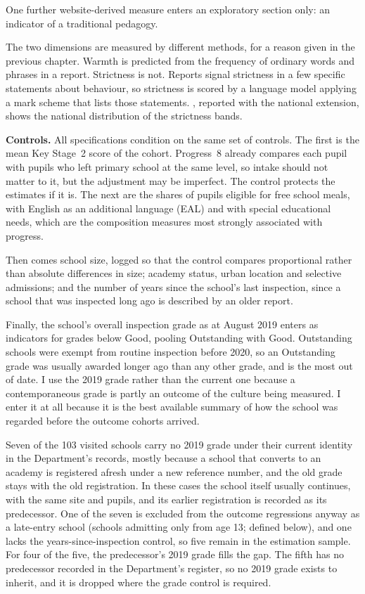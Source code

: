 One further website-derived measure enters an exploratory section only: an indicator of a traditional pedagogy.

The two dimensions are measured by different methods, for a reason given in the previous chapter. Warmth is predicted from the frequency of ordinary words and phrases in a report. Strictness is not. Reports signal strictness in a few specific statements about behaviour, so strictness is scored by a language model applying a mark scheme that lists those statements. , reported with the national extension, shows the national distribution of the strictness bands.

\textbf{Controls.} All specifications condition on the same set of
controls. The first is the mean Key Stage~2 score of the cohort. Progress~8 already compares each pupil with pupils who left primary school at the same level, so intake should not matter to it, but the adjustment may be imperfect. The control protects the estimates if it is. The next are the shares of pupils eligible for free school meals, with English as an additional language (EAL) and with special educational needs, which are the composition measures most strongly associated with progress.

Then comes school size, logged so that the control compares proportional rather than absolute differences in size; academy status, urban location and selective admissions; and
the number of years since the school's last inspection, since a school that
was inspected long ago is described by an older report.

Finally, the school's overall inspection grade as at August 2019 enters as indicators for grades below Good,
pooling Outstanding with Good. Outstanding schools were exempt from
routine inspection before 2020, so an Outstanding grade was usually awarded longer ago than any other grade, and is the most out of date. I use the 2019 grade rather than the current one because a
contemporaneous grade is partly an outcome of the culture being measured. I
enter it at all because it is the best available summary of how the school
was regarded before the outcome
cohorts arrived.

Seven of the 103 visited schools carry no 2019 grade under their current identity in the Department's records, mostly because a school that converts to an academy is registered afresh under a new reference number, and the old grade stays with the old registration. In these cases the school itself usually continues, with the same site and pupils, and its earlier registration is recorded as its predecessor. One of the seven is excluded from the outcome regressions anyway as a late-entry school (schools admitting only from age 13; defined below), and one lacks the years-since-inspection control, so five remain in the estimation sample. For four of the five, the predecessor's 2019 grade fills the gap. The fifth has no predecessor recorded in the Department's register, so no 2019 grade exists to inherit, and it is dropped where the grade control is required.

